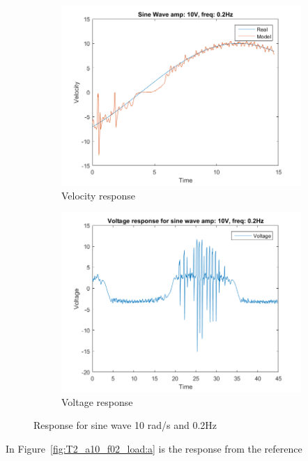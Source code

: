 \documentclass[12pt,a4paper]{article}
\begin{document}
\begin{figure}[H]
  \centering
  \begin{subfigure}[b]{0.45\linewidth}
    \includegraphics[width=\linewidth]{T2_a10_f02.png}
    \caption{Velocity response }
    \label{fig:T2_a10_f02:a}
  \end{subfigure}
  \begin{subfigure}[b]{0.45\linewidth}
    \includegraphics[width=\linewidth]{T2_V_a10_f02.png}
    \caption{Voltage response }
    \label{fig:T2_a10_f02:b}
  \end{subfigure}
  \caption{Response for sine wave 10 rad/s and 0.2Hz}
  \label{fig:T2_a10_f02}
\end{figure}
In Figure~\ref{fig:T2_a10_f02_load:a} is the response from the reference
\end{document}
